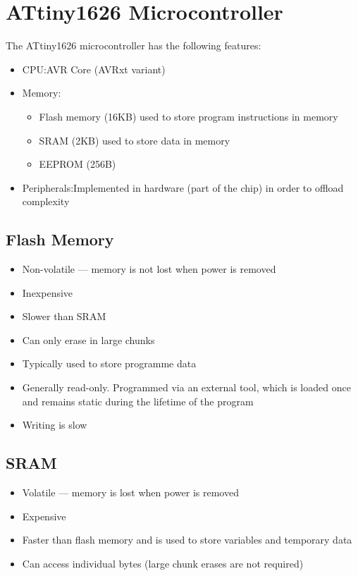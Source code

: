 \documentclass{report}
\begin{document}
\section{ATtiny1626 Microcontroller}
The ATtiny1626 microcontroller has the following features:
\begin{itemize}
    \item CPU:\@ AVR Core (AVRxt variant)
    \item Memory:\@
          \begin{itemize}
              \item Flash memory (16KB) used to store program instructions in memory
              \item SRAM (2KB) used to store data in memory
              \item EEPROM (256B)
          \end{itemize}
    \item Peripherals:\@ Implemented in hardware (part of the chip) in order to offload complexity
\end{itemize}
\subsection{Flash Memory}
\begin{itemize}
    \item Non-volatile --- memory is not lost when power is removed
    \item Inexpensive
    \item Slower than SRAM
    \item Can only erase in large chunks
    \item Typically used to store programme data
    \item Generally read-only. Programmed via an external tool, which is loaded once and remains static during the lifetime of the program
    \item Writing is slow
\end{itemize}
\subsection{SRAM}
\begin{itemize}
    \item Volatile --- memory is lost when power is removed
    \item Expensive
    \item Faster than flash memory and is used to store variables and temporary data
    \item Can access individual bytes (large chunk erases are not required)
\end{itemize}
\end{document}

